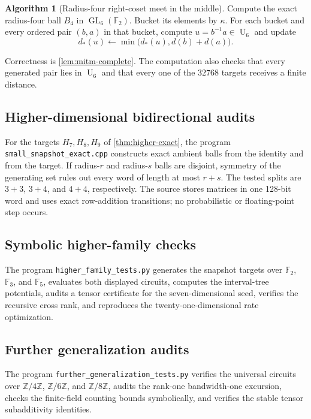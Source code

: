 \documentclass[11pt]{amsart}
\numberwithin{equation}{section}
\theoremstyle{definition}
\newtheorem{algorithm}[theorem]{Algorithm}
\theoremstyle{remark}
\newcommand{\F}{\mathbb F}
\newcommand{\GL}{\operatorname{GL}}
\newcommand{\U}{\operatorname{U}}
\begin{document}
\begin{algorithm}[Radius-four right-coset meet in the middle]
Compute the exact radius-four ball $B_4$ in $\GL_6(\F_2)$.  Bucket its elements by $\kappa$.  For each bucket and every ordered pair $(b,a)$ in that bucket, compute $u=b^{-1}a\in\U_6$ and update
\[
d_*(u)\leftarrow
\min\bigl(d_*(u),d(b)+d(a)\bigr).
\]
\end{algorithm}

Correctness is \cref{lem:mitm-complete}.  The computation also checks that every generated pair lies in $\U_6$ and that every one of the $32768$ targets receives a finite distance.

\subsection{Higher-dimensional bidirectional audits}

For the targets $H_7,H_8,H_9$ of \cref{thm:higher-exact}, the program \texttt{small\_snapshot\_exact.cpp} constructs exact ambient balls from the identity and from the target.  If radius-$r$ and radius-$s$ balls are disjoint, symmetry of the generating set rules out every word of length at most $r+s$.  The tested splits are $3+3$, $3+4$, and $4+4$, respectively.  The source stores matrices in one 128-bit word and uses exact row-addition transitions; no probabilistic or floating-point step occurs.

\subsection{Symbolic higher-family checks}

The program \texttt{higher\_family\_tests.py} generates the snapshot targets over $\F_2$, $\F_3$, and $\F_5$, evaluates both displayed circuits, computes the interval-tree potentials, audits a tensor certificate for the seven-dimensional seed, verifies the recursive cross rank, and reproduces the twenty-one-dimensional rate optimization.

\subsection{Further generalization audits}

The program \texttt{further\_generalization\_tests.py} verifies the universal circuits over $\mathbb Z/4\mathbb Z$, $\mathbb Z/6\mathbb Z$, and $\mathbb Z/8\mathbb Z$, audits the rank-one bandwidth-one excursion, checks the finite-field counting bounds symbolically, and verifies the stable tensor subadditivity identities.
\end{document}
